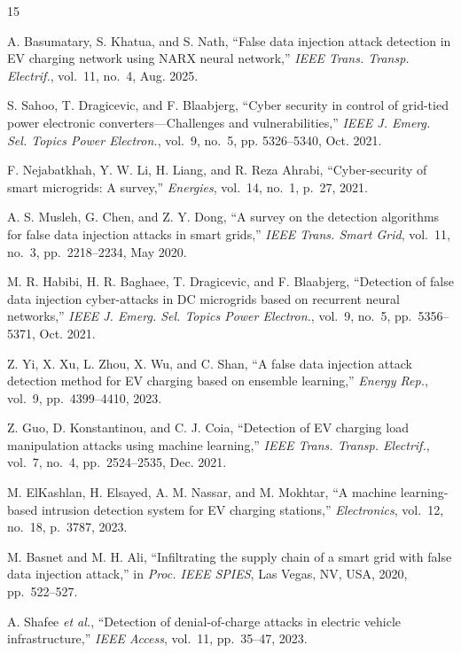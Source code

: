 \documentclass[journal]{IEEEtran}
\begin{document}
\begin{thebibliography}{15}

A. Basumatary, S. Khatua, and S. Nath,
``False data injection attack detection in EV charging network using
NARX neural network,''
\emph{IEEE Trans. Transp. Electrif.}, vol.~11, no.~4, Aug. 2025.

S. Sahoo, T. Dragicevic, and F. Blaabjerg,
``Cyber security in control of grid-tied power electronic converters---Challenges
and vulnerabilities,''
\emph{IEEE J. Emerg. Sel. Topics Power Electron.}, vol.~9, no.~5,
pp. 5326--5340, Oct. 2021.

F. Nejabatkhah, Y. W. Li, H. Liang, and R. Reza Ahrabi,
``Cyber-security of smart microgrids: A survey,''
\emph{Energies}, vol.~14, no.~1, p.~27, 2021.

A. S. Musleh, G. Chen, and Z. Y. Dong,
``A survey on the detection algorithms for false data injection attacks
in smart grids,''
\emph{IEEE Trans. Smart Grid}, vol.~11, no.~3, pp.~2218--2234, May 2020.

M. R. Habibi, H. R. Baghaee, T. Dragicevic, and F. Blaabjerg,
``Detection of false data injection cyber-attacks in DC microgrids based
on recurrent neural networks,''
\emph{IEEE J. Emerg. Sel. Topics Power Electron.}, vol.~9, no.~5,
pp.~5356--5371, Oct. 2021.

Z. Yi, X. Xu, L. Zhou, X. Wu, and C. Shan,
``A false data injection attack detection method for EV charging based on
ensemble learning,''
\emph{Energy Rep.}, vol.~9, pp.~4399--4410, 2023.

Z. Guo, D. Konstantinou, and C. J. Coia,
``Detection of EV charging load manipulation attacks using machine learning,''
\emph{IEEE Trans. Transp. Electrif.}, vol.~7, no.~4,
pp.~2524--2535, Dec. 2021.

M. ElKashlan, H. Elsayed, A. M. Nassar, and M. Mokhtar,
``A machine learning-based intrusion detection system for EV charging stations,''
\emph{Electronics}, vol.~12, no.~18, p.~3787, 2023.

M. Basnet and M. H. Ali,
``Infiltrating the supply chain of a smart grid with false data injection attack,''
in \emph{Proc. IEEE SPIES}, Las Vegas, NV, USA, 2020, pp.~522--527.

A. Shafee \emph{et al.},
``Detection of denial-of-charge attacks in electric vehicle infrastructure,''
\emph{IEEE Access}, vol.~11, pp.~35--47, 2023.


\end{thebibliography}
\end{document}
